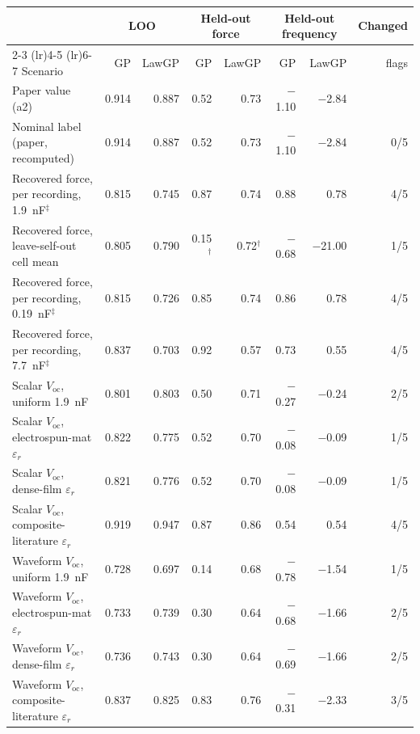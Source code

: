 \begin{tabular}{l rr rr rr r}
\toprule
 & \multicolumn{2}{c}{LOO} & \multicolumn{2}{c}{Held-out force} & \multicolumn{2}{c}{Held-out frequency} & Changed \\
\cmidrule(lr){2-3} \cmidrule(lr){4-5} \cmidrule(lr){6-7}
Scenario & GP & LawGP & GP & LawGP & GP & LawGP & flags \\
\midrule
Paper value (a2) & 0.914 & 0.887 & 0.52 & 0.73 & $-$1.10 & $-$2.84 & \\
Nominal label (paper, recomputed) & 0.914 & 0.887 & 0.52 & 0.73 & $-$1.10 & $-$2.84 & 0/5 \\
Recovered force, per recording, \SI{1.9}{\nano\farad}$^\ddagger$ & 0.815 & 0.745 & 0.87 & 0.74 & 0.88 & 0.78 & 4/5 \\
Recovered force, leave-self-out cell mean & 0.805 & 0.790 & 0.15$^\dagger$ & 0.72$^\dagger$ & $-$0.68 & $-$21.00 & 1/5 \\
Recovered force, per recording, \SI{0.19}{\nano\farad}$^\ddagger$ & 0.815 & 0.726 & 0.85 & 0.74 & 0.86 & 0.78 & 4/5 \\
Recovered force, per recording, \SI{7.7}{\nano\farad}$^\ddagger$ & 0.837 & 0.703 & 0.92 & 0.57 & 0.73 & 0.55 & 4/5 \\
Scalar $V_\mathrm{oc}$, uniform \SI{1.9}{\nano\farad} & 0.801 & 0.803 & 0.50 & 0.71 & $-$0.27 & $-$0.24 & 2/5 \\
Scalar $V_\mathrm{oc}$, electrospun-mat $\varepsilon_r$ & 0.822 & 0.775 & 0.52 & 0.70 & $-$0.08 & $-$0.09 & 1/5 \\
Scalar $V_\mathrm{oc}$, dense-film $\varepsilon_r$ & 0.821 & 0.776 & 0.52 & 0.70 & $-$0.08 & $-$0.09 & 1/5 \\
Scalar $V_\mathrm{oc}$, composite-literature $\varepsilon_r$ & 0.919 & 0.947 & 0.87 & 0.86 & 0.54 & 0.54 & 4/5 \\
Waveform $V_\mathrm{oc}$, uniform \SI{1.9}{\nano\farad} & 0.728 & 0.697 & 0.14 & 0.68 & $-$0.78 & $-$1.54 & 1/5 \\
Waveform $V_\mathrm{oc}$, electrospun-mat $\varepsilon_r$ & 0.733 & 0.739 & 0.30 & 0.64 & $-$0.68 & $-$1.66 & 2/5 \\
Waveform $V_\mathrm{oc}$, dense-film $\varepsilon_r$ & 0.736 & 0.743 & 0.30 & 0.64 & $-$0.69 & $-$1.66 & 2/5 \\
Waveform $V_\mathrm{oc}$, composite-literature $\varepsilon_r$ & 0.837 & 0.825 & 0.83 & 0.76 & $-$0.31 & $-$2.33 & 3/5 \\
\bottomrule
\end{tabular}
